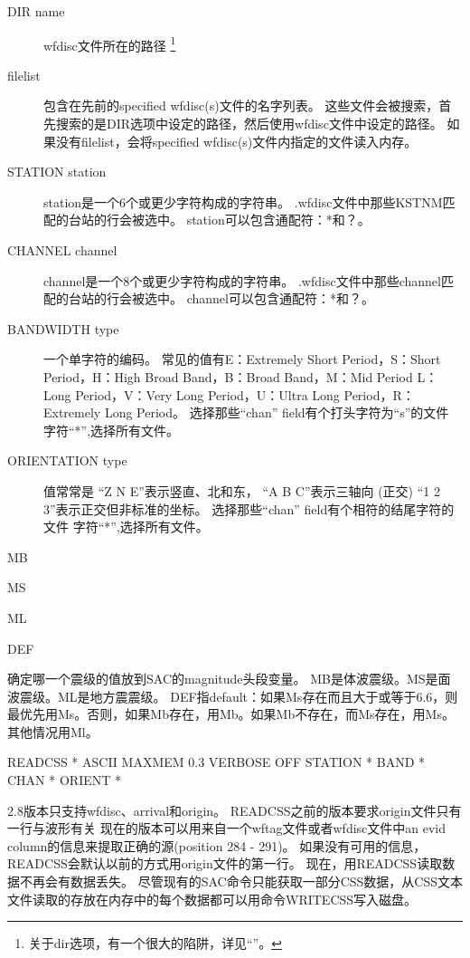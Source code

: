 \begin{description}
\item [DIR name] wfdisc文件所在的路径
    \footnote{关于dir选项，有一个很大的陷阱，详见``''。}
\item [filelist] 包含在先前的specified wfdisc(s)文件的名字列表。%
    这些文件会被搜索，首先搜索的是DIR选项中设定的路径，然后使用wfdisc文件中设定的路径。
    如果没有filelist，会将specified wfdisc(s)文件内指定的文件读入内存。
\item[STATION station]station是一个6个或更少字符构成的字符串。
    .wfdisc文件中那些KSTNM匹配的台站的行会被选中。
    station可以包含通配符：*和？。
\item[CHANNEL channel]channel是一个8个或更少字符构成的字符串。
    .wfdisc文件中那些channel匹配的台站的行会被选中。
    channel可以包含通配符：*和？。
\item [BANDWIDTH type] 一个单字符的编码。
    常见的值有E：Extremely Short Period，S：Short Period，H：High Broad Band，B：Broad Band，M：Mid Period
    L：Long Period，V：Very Long Period，U：Ultra Long Period，R：Extremely Long Period。
    选择那些``chan'' field有个打头字符为``s''的文件%
    字符``*'',选择所有文件。
\item [ORIENTATION type]值常常是
    ``Z N E''表示竖直、北和东，
    ``A B C''表示三轴向 (正交)%
    ``1 2 3''表示正交但非标准的坐标。
    选择那些``chan'' field有个相符的结尾字符的文件%
    字符``*'',选择所有文件。
\end{description}
MB

MS

ML

DEF

确定哪一个震级的值放到SAC的magnitude头段变量。
MB是体波震级。MS是面波震级。ML是地方震震级。
DEF指default：如果Ms存在而且大于或等于6.6，则最优先用Ms。否则，如果Mb存在，用Mb。如果Mb不存在，而Ms存在，用Ms。其他情况用Ml。%
\begin{SACSTX}
READCSS * ASCII MAXMEM 0.3 VERBOSE OFF STATION * BAND * CHAN * ORIENT *%
\end{SACSTX}
2.8版本只支持wfdisc、arrival和origin。
READCSS之前的版本要求origin文件只有一行与波形有关%
现在的版本可以用来自一个wftag文件或者wfdisc文件中an evid column的信息来提取正确的源(position 284 - 291)。%
如果没有可用的信息，READCSS会默认以前的方式用origin文件的第一行。
现在，用READCSS读取数据不再会有数据丢失。
尽管现有的SAC命令只能获取一部分CSS数据，从CSS文本文件读取的存放在内存中的每个数据都可以用命令WRITECSS写入磁盘。

